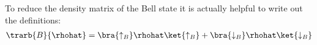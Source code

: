 To reduce the density matrix of the Bell state it is actually helpful to write out the definitions:
\begin{align}
\trarb{B}{\rhohat} = \bra{\uparrow_B}\rhohat\ket{\uparrow_B}+\bra{\downarrow_B}\rhohat\ket{\downarrow_B}
\end{align}